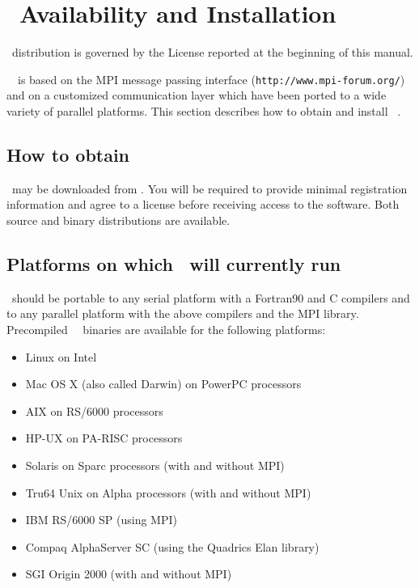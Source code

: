 \section{\PDAC\ Availability and Installation}
\label{section:avail}

\PDAC\ distribution is governed by the License reported at the beginning
of this manual.

\PDAC\ \PDACVERSION\ is based on the MPI message passing interface
({\tt http://www.mpi-forum.org/})
and on a customized communication layer which have been ported to a wide 
variety of parallel platforms.
This section describes how to obtain and install \PDAC\ \PDACVERSION.

\subsection{How to obtain \PDAC}

\PDAC\ may be downloaded from \PDACURL.
You will be required to provide minimal registration information and
agree to a license before receiving access to the software.
Both source and binary distributions are available.

\subsection{Platforms on which \PDAC\ will currently run}

\PDAC\ should be portable to any serial platform with a
Fortran90 and C compilers and to any parallel platform with
the above compilers and the MPI library.
Precompiled \PDAC\ \PDACVERSION\ binaries are available for the following platforms:  
\begin{itemize}
\item Linux on Intel
\item Mac OS X (also called Darwin) on PowerPC processors
\item AIX on RS/6000 processors 
\item HP-UX on PA-RISC processors 
\item Solaris on Sparc processors (with and without MPI)
\item Tru64 Unix on Alpha processors (with and without MPI)
\item IBM RS/6000 SP (using MPI)
\item Compaq AlphaServer SC (using the Quadrics Elan library)
\item SGI Origin 2000 (with and without MPI) 
\end{itemize}


